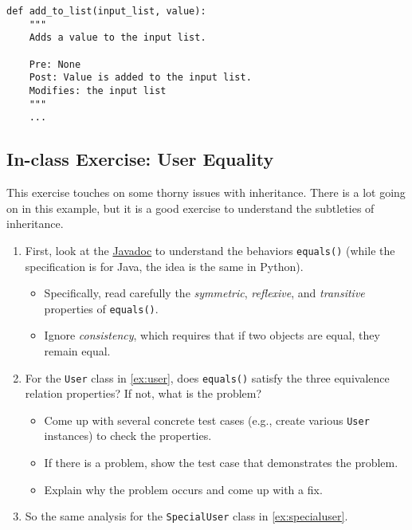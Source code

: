 \documentclass[oneside,11pt,dvipsnames]{book}
\newcommand{\code}[1]{\texttt{#1}}
\begin{document}
\begin{lstlisting}
def add_to_list(input_list, value):
    """
    Adds a value to the input list.

    Pre: None
    Post: Value is added to the input list.
    Modifies: the input list
    """
    ...
\end{lstlisting}


\subsection{In-class Exercise: User Equality}
This exercise touches on some thorny issues with inheritance. There is a lot going on in this example, but it is a good exercise to understand the subtleties of inheritance. 

\begin{enumerate}
    \item First, look at the \href{https://docs.oracle.com/javase/8/docs/api/java/lang/Object.html#equals-java.lang.Object-}{Javadoc} to understand the behaviors \code{equals()} (while the specification is for Java, the idea is the same in Python).
    \begin{itemize}
        \item Specifically, read carefully the \emph{symmetric}, \emph{reflexive}, and \emph{transitive} properties of \code{equals()}.
        \item Ignore \emph{consistency}, which requires that if two objects are equal, they remain equal.
    \end{itemize}    
    \item For the \code{User} class in \autoref{ex:user}, does \code{equals()} satisfy the three equivalence relation properties? If not, what is the problem?
    \begin{itemize}
        \item Come up with several concrete test cases (e.g., create various \code{User} instances) to check the properties.
        \item If there is a problem, show the test case that demonstrates the problem.
        \item Explain why the problem occurs and come up with a fix.
    \end{itemize}
    \item So the same analysis for the \code{SpecialUser} class in \autoref{ex:specialuser}.
    \end{enumerate}
    
    
\end{document}
